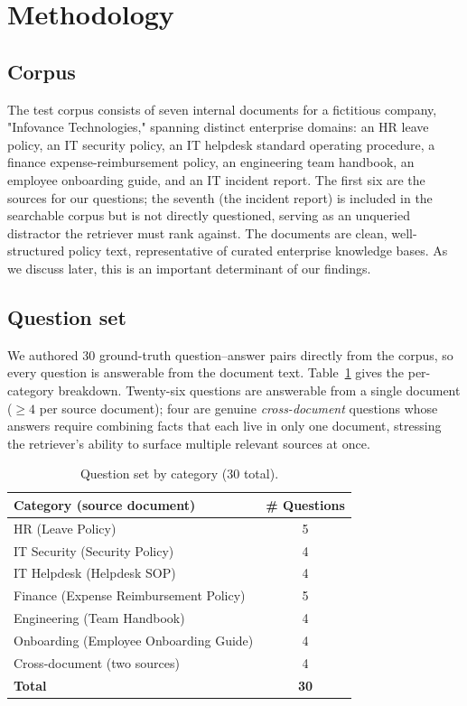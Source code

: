 \documentclass[conference]{IEEEtran}
\begin{document}
\section{Methodology}
\subsection{Corpus}
The test corpus consists of seven internal documents for a
fictitious company, "Infovance Technologies," spanning distinct enterprise
domains: an HR leave policy, an IT security policy, an IT helpdesk standard
operating procedure, a finance expense-reimbursement policy, an engineering team
handbook, an employee onboarding guide, and an IT incident report. The first six
are the sources for our questions; the seventh (the incident report) is included
in the searchable corpus but is not directly questioned, serving as an unqueried
distractor the retriever must rank against. The documents are clean,
well-structured policy text, representative of curated enterprise knowledge
bases. As we discuss later, this is an important determinant of our findings.

\subsection{Question set}
We authored 30 ground-truth question--answer pairs directly from the corpus, so
every question is answerable from the document text. Table~\ref{tab:questions}
gives the per-category breakdown. Twenty-six questions are answerable from a
single document ($\geq 4$ per source document); four are genuine
\emph{cross-document} questions whose answers require combining facts that each
live in only one document, stressing the retriever's ability to surface multiple
relevant sources at once.

\begin{table}[t]
\caption{Question set by category (30 total).}
\label{tab:questions}
\centering
\footnotesize
\begin{tabular}{@{}lc@{}}
\toprule
\textbf{Category (source document)} & \textbf{\# Questions} \\
\midrule
HR (Leave Policy)                          & 5 \\
IT Security (Security Policy)              & 4 \\
IT Helpdesk (Helpdesk SOP)                 & 4 \\
Finance (Expense Reimbursement Policy)     & 5 \\
Engineering (Team Handbook)                & 4 \\
Onboarding (Employee Onboarding Guide)     & 4 \\
Cross-document (two sources)               & 4 \\
\midrule
\textbf{Total}                             & \textbf{30} \\
\bottomrule
\end{tabular}
\end{table}
\end{document}
